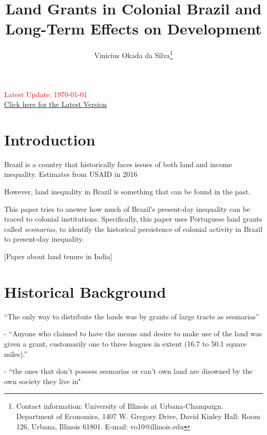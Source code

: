 \documentclass{article}
\title{Land Grants in Colonial Brazil and Long-Term Effects on Development}
\author{Vinicius Okada da Silva\thanks{Contact information: University of Illinois at Urbana-Champaign. Department of Economics, 1407 W. Gregory Drive, David Kinley Hall: Room 126, Urbana, Illinois 61801. E-mail: vo10@illinois.edu}}
\affil{Department of Economics, University of Illinois at Urbana-Champaign}
\date{}
\begin{document}
\maketitle
\thispagestyle{empty} 

\vspace{-.1cm}
\begin{center}
  \textcolor{red}{Latest Update: \today}
  \\
  \href{https://viniokadasilva.github.io/Papers/Sesmarias/02.Draft/02.Second_Draft/Sesmarias_Paper.pdf}{Click here for the Latest Version}
\end{center}
\vspace{.1cm}

\clearpage
{} 

\section{Introduction}

Brazil is a country that historically faces issues of both land and income inequality. Estimates from USAID in 2016

However, land inequality in Brazil is something that can be found in the past.

This paper tries to answer how much of Brazil's present-day inequality can be traced to colonial institutions. Specifically, this paper uses Portuguese land grants called \textit{sesmarias}, to identify the historical persistence of colonial activity in Brazil to present-day inequality.

\parencite{Dell2010-qt}
\parencite{Sokoloff2000-mb}



\textcite{Ratnoo2023-vw} [Paper about land tenure in India]


\section{Historical Background}

\textcite{Smith1944-oi} ``The only way to distribute the lands was by grants of large tracts as sesmarias''

\textcite{Dean1971-iq} - ``Anyone who claimed to have the means and desire to make use of the land was given a grant, customarily one to three leagues in extent (16.7 to 50.1 square miles).''

\textcite{Simonsen2005-ps} - ``the ones that don't possess sesmarias or can't own land are disowned by the own society they live in"
\end{document}
